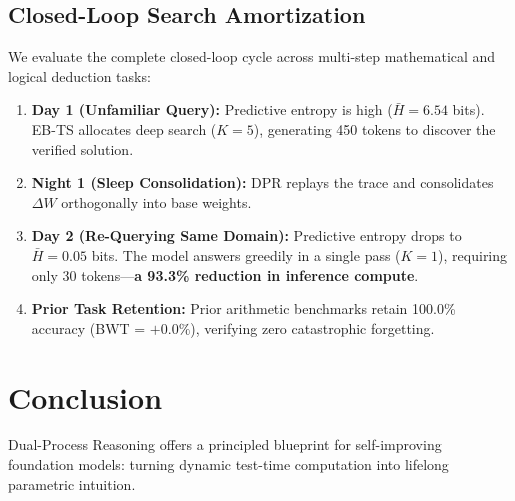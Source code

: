 \documentclass{article}
\begin{document}
\subsection{Closed-Loop Search Amortization}
We evaluate the complete closed-loop cycle across multi-step mathematical and logical deduction tasks:
\begin{enumerate}
    \item \textbf{Day 1 (Unfamiliar Query):} Predictive entropy is high ($\bar{H} = 6.54$ bits). EB-TS allocates deep search ($K=5$), generating 450 tokens to discover the verified solution.
    \item \textbf{Night 1 (Sleep Consolidation):} DPR replays the trace and consolidates $\Delta W$ orthogonally into base weights.
    \item \textbf{Day 2 (Re-Querying Same Domain):} Predictive entropy drops to $\bar{H} = 0.05$ bits. The model answers greedily in a single pass ($K=1$), requiring only 30 tokens---\textbf{a 93.3\% reduction in inference compute}.
    \item \textbf{Prior Task Retention:} Prior arithmetic benchmarks retain 100.0\% accuracy (BWT = $+0.0\%$), verifying zero catastrophic forgetting.
\end{enumerate}

\section{Conclusion}
Dual-Process Reasoning offers a principled blueprint for self-improving foundation models: turning dynamic test-time computation into lifelong parametric intuition.



\end{document}
